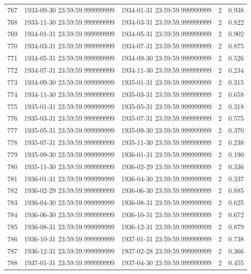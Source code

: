 \begin{table}
\begin{tabular}{lcccc}
767 & 1933-09-30 23:59:59.999999999 & 1934-01-31 23:59:59.999999999 & 2 & 0.938 \\
768 & 1933-11-30 23:59:59.999999999 & 1934-03-31 23:59:59.999999999 & 2 & 0.822 \\
769 & 1934-01-31 23:59:59.999999999 & 1934-05-31 23:59:59.999999999 & 2 & 0.902 \\
770 & 1934-03-31 23:59:59.999999999 & 1934-07-31 23:59:59.999999999 & 2 & 0.875 \\
771 & 1934-05-31 23:59:59.999999999 & 1934-09-30 23:59:59.999999999 & 2 & 0.526 \\
772 & 1934-07-31 23:59:59.999999999 & 1934-11-30 23:59:59.999999999 & 2 & 0.234 \\
773 & 1934-09-30 23:59:59.999999999 & 1935-01-31 23:59:59.999999999 & 2 & 0.315 \\
774 & 1934-11-30 23:59:59.999999999 & 1935-03-31 23:59:59.999999999 & 2 & 0.658 \\
775 & 1935-01-31 23:59:59.999999999 & 1935-05-31 23:59:59.999999999 & 2 & 0.318 \\
776 & 1935-03-31 23:59:59.999999999 & 1935-07-31 23:59:59.999999999 & 2 & 0.575 \\
777 & 1935-05-31 23:59:59.999999999 & 1935-09-30 23:59:59.999999999 & 2 & 0.370 \\
778 & 1935-07-31 23:59:59.999999999 & 1935-11-30 23:59:59.999999999 & 2 & 0.238 \\
779 & 1935-09-30 23:59:59.999999999 & 1936-01-31 23:59:59.999999999 & 2 & 0.190 \\
780 & 1935-11-30 23:59:59.999999999 & 1936-02-29 23:59:59.999999999 & 2 & 0.336 \\
781 & 1936-01-31 23:59:59.999999999 & 1936-04-30 23:59:59.999999999 & 2 & 0.337 \\
782 & 1936-02-29 23:59:59.999999999 & 1936-06-30 23:59:59.999999999 & 2 & 0.885 \\
783 & 1936-04-30 23:59:59.999999999 & 1936-08-31 23:59:59.999999999 & 2 & 0.625 \\
784 & 1936-06-30 23:59:59.999999999 & 1936-10-31 23:59:59.999999999 & 2 & 0.672 \\
785 & 1936-08-31 23:59:59.999999999 & 1936-12-31 23:59:59.999999999 & 2 & 0.879 \\
786 & 1936-10-31 23:59:59.999999999 & 1937-01-31 23:59:59.999999999 & 2 & 0.738 \\
787 & 1936-12-31 23:59:59.999999999 & 1937-02-28 23:59:59.999999999 & 2 & 0.366 \\
788 & 1937-01-31 23:59:59.999999999 & 1937-04-30 23:59:59.999999999 & 2 & 0.455 \\

\end{tabular}
\end{table}
